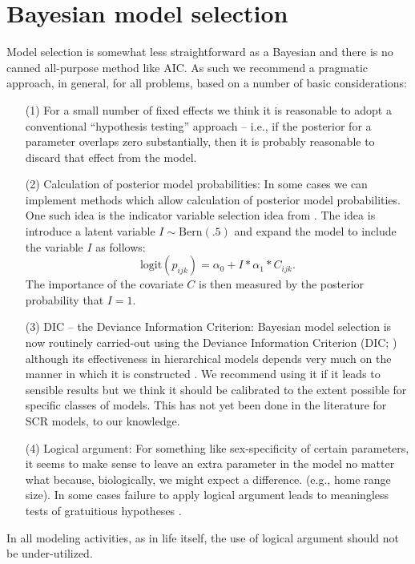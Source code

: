 \section{Bayesian model selection}

Model selection is somewhat less straightforward as a Bayesian and
there is no canned all-purpose method like AIC. As such we
recommend a pragmatic approach, in general, for all problems,
based on a number of basic considerations:
\begin{itemize}
\item[(1)] For a small number of fixed effects we think it is
  reasonable to adopt a conventional ``hypothesis testing'' approach
  -- i.e., if the posterior for a parameter overlaps zero
  substantially, then it is probably reasonable to discard that
  effect from the model.
\item[(2)] Calculation of posterior model probabilities: In some cases
  we can implement methods which allow calculation of posterior model
  probabilities. One such idea is the indicator variable selection
  idea from \citet{kuo_mallick:1998}.  The idea is introduce a latent
  variable $I \sim \mbox{Bern}(.5)$ and expand the model to include
  the variable $I$ as follows:
\[
 \mbox{logit}(p_{ijk}) = \alpha_{0} + I*\alpha_{1}*C_{ijk}.
\]
The importance of the covariate $C$ is then measured by the posterior
probability that $I=1$.
\item[(3)] DIC -- the Deviance Information Criterion: Bayesian model
  selection is now routinely carried-out using the Deviance
  Information Criterion (DIC; \citet{spiegelhalter_etal:2002})
  although its
  effectiveness in hierarchical models depends very much on the manner
  in which it is constructed \citep{millar:2009}.  We recommend using
  it if it leads to sensible results but we think it should be
  calibrated to the extent possible for specific classes of models.
  This has not yet been done in the literature for SCR models, to our knowledge.
\item[(4)] Logical argument: For something like sex-specificity of
  certain parameters, it seems to make sense to leave an extra
  parameter in the model no matter what because, biologically, we might
 expect a difference. (e.g., home range size).
In some cases failure to apply logical argument leads to
  meaningless tests of gratuitious hypotheses \citep{johnson:1999}.
\end{itemize}
In all modeling activities, as in life itself, the use of logical argument should not be under-utilized.

